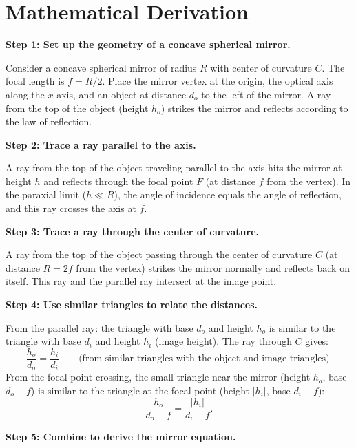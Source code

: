 \section*{Mathematical Derivation}

\textbf{Step 1: Set up the geometry of a concave spherical mirror.}

Consider a concave spherical mirror of radius $R$ with center of curvature $C$. The focal length is $f = R/2$. Place the mirror vertex at the origin, the optical axis along the $x$-axis, and an object at distance $d_o$ to the left of the mirror. A ray from the top of the object (height $h_o$) strikes the mirror and reflects according to the law of reflection.

\textbf{Step 2: Trace a ray parallel to the axis.}

A ray from the top of the object traveling parallel to the axis hits the mirror at height $h$ and reflects through the focal point $F$ (at distance $f$ from the vertex). In the paraxial limit ($h \ll R$), the angle of incidence equals the angle of reflection, and this ray crosses the axis at $f$.

\textbf{Step 3: Trace a ray through the center of curvature.}

A ray from the top of the object passing through the center of curvature $C$ (at distance $R = 2f$ from the vertex) strikes the mirror normally and reflects back on itself. This ray and the parallel ray intersect at the image point.

\textbf{Step 4: Use similar triangles to relate the distances.}

From the parallel ray: the triangle with base $d_o$ and height $h_o$ is similar to the triangle with base $d_i$ and height $h_i$ (image height). The ray through $C$ gives:
\begin{equation}
\frac{h_o}{d_o} = \frac{h_i}{d_i} \qquad\text{(from similar triangles with the object and image triangles)}.
\end{equation}
From the focal-point crossing, the small triangle near the mirror (height $h_o$, base $d_o - f$) is similar to the triangle at the focal point (height $|h_i|$, base $d_i - f$):
\begin{equation}
\frac{h_o}{d_o - f} = \frac{|h_i|}{d_i - f}.
\end{equation}

\textbf{Step 5: Combine to derive the mirror equation.}

